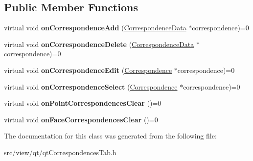 \subsection*{Public Member Functions}
\begin{DoxyCompactItemize}
\item 
\hypertarget{classqt_correspondences_tab_aeae94691e7d805bd59f55d7089e3877b}{}virtual void {\bfseries on\+Correspondence\+Add} (\hyperlink{class_correspondence_data}{Correspondence\+Data} $\ast$correspondence)=0\label{classqt_correspondences_tab_aeae94691e7d805bd59f55d7089e3877b}

\item 
\hypertarget{classqt_correspondences_tab_a72f76de30e069736cfcebb88327bfd2b}{}virtual void {\bfseries on\+Correspondence\+Delete} (\hyperlink{class_correspondence_data}{Correspondence\+Data} $\ast$correspondence)=0\label{classqt_correspondences_tab_a72f76de30e069736cfcebb88327bfd2b}

\item 
\hypertarget{classqt_correspondences_tab_a2dcdf110605a3248765096b201b96a6b}{}virtual void {\bfseries on\+Correspondence\+Edit} (\hyperlink{class_correspondence}{Correspondence} $\ast$correspondence)=0\label{classqt_correspondences_tab_a2dcdf110605a3248765096b201b96a6b}

\item 
\hypertarget{classqt_correspondences_tab_adabc383fed7b49ed81d98c1a8aedfbab}{}virtual void {\bfseries on\+Correspondence\+Select} (\hyperlink{class_correspondence}{Correspondence} $\ast$correspondence)=0\label{classqt_correspondences_tab_adabc383fed7b49ed81d98c1a8aedfbab}

\item 
\hypertarget{classqt_correspondences_tab_a27b27c974712221e92ce16f2b6dc3661}{}virtual void {\bfseries on\+Point\+Correspondences\+Clear} ()=0\label{classqt_correspondences_tab_a27b27c974712221e92ce16f2b6dc3661}

\item 
\hypertarget{classqt_correspondences_tab_a7f93bc060bfaab22019d910113487356}{}virtual void {\bfseries on\+Face\+Correspondences\+Clear} ()=0\label{classqt_correspondences_tab_a7f93bc060bfaab22019d910113487356}

\end{DoxyCompactItemize}


The documentation for this class was generated from the following file\+:\begin{DoxyCompactItemize}
\item 
src/view/qt/qt\+Correspondences\+Tab.\+h\end{DoxyCompactItemize}
